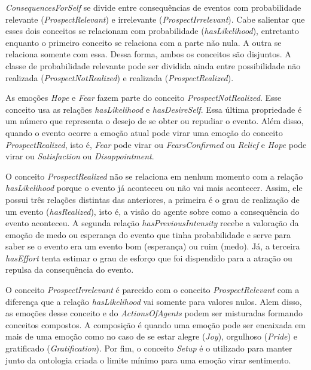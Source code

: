 \emph{ConsequencesForSelf} se divide entre consequências de eventos com
probabilidade relevante (\emph{ProspectRelevant}) e irrelevante
(\emph{ProspectIrrelevant}). Cabe salientar que esses dois conceitos se
relacionam com probabilidade (\emph{hasLikelihood}), entretanto enquanto o
primeiro conceito se relaciona com a parte não nula. A outra se relaciona
somente com essa. Dessa forma, ambos os conceitos são disjuntos. A classe de
probabilidade relevante pode ser dividida ainda entre possibilidade não
realizada (\emph{ProspectNotRealized}) e realizada (\emph{ProspectRealized}).

As emoções \emph{Hope} e \emph{Fear} fazem parte do conceito
\emph{ProspectNotRealized}. Esse conceito usa as relações \emph{hasLikelihood}
e \emph{hasDesireSelf}. Essa última propriedade é um número que
representa o desejo de se obter ou repudiar o evento. Além disso, quando o
evento ocorre a emoção atual pode virar uma emoção do conceito
\emph{ProspectRealized}, isto é, \emph{Fear} pode virar ou
\emph{FearsConfirmed} ou \emph{Relief} e \emph{Hope} pode virar ou
\emph{Satisfaction} ou \emph{Disappointment}.

O conceito \emph{ProspectRealized} não se relaciona em nenhum momento com a
relação \emph{hasLikelihood} porque o evento já aconteceu ou não vai mais
acontecer. Assim, ele possui três relações distintas das anteriores, a
primeira é o grau de realização de um evento (\emph{hasRealized}), isto é, a
visão do agente sobre como a consequência do evento aconteceu. A segunda
relação \emph{hasPreviousIntensity} recebe a valoração da emoção de medo ou
esperança do evento que tinha probabilidade e serve para saber se o evento era
um evento bom (esperança) ou ruim (medo). Já, a terceira \emph{hasEffort}
tenta estimar o grau de esforço que foi dispendido para a atração ou repulsa
da consequência do evento.

O conceito \emph{ProspectIrrelevant} é parecido com o conceito
\emph{ProspectRelevant} com a diferença que a relação \emph{hasLikelihood} vai
somente para valores nulos. Alem disso, as emoções desse conceito e do
\emph{ActionsOfAgents} podem ser misturadas formando conceitos compostos.
A composição é quando uma emoção pode ser encaixada em mais de uma emoção
como no caso de se estar alegre (\emph{Joy}), orgulhoso (\emph{Pride}) e
gratificado (\emph{Gratification}). Por fim, o conceito \emph{Setup}
é o utilizado para manter junto da ontologia criada o limite mínimo para uma
emoção virar sentimento\dev{}.


